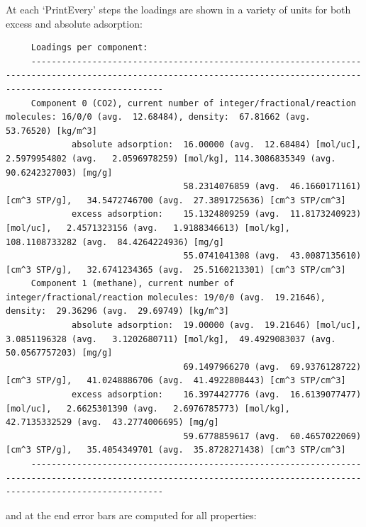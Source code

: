 At each `PrintEvery' steps the loadings are shown in a variety of units for both excess and absolute adsorption:
\begin{tiny}
\begin{verbatim}
     Loadings per component:
     ----------------------------------------------------------------------------------------------------------------------------------------------------------------------
     Component 0 (CO2), current number of integer/fractional/reaction molecules: 16/0/0 (avg.  12.68484), density:  67.81662 (avg.  53.76520) [kg/m^3]
             absolute adsorption:  16.00000 (avg.  12.68484) [mol/uc],   2.5979954802 (avg.   2.0596978259) [mol/kg], 114.3086835349 (avg.  90.6242327003) [mg/g]
                                   58.2314076859 (avg.  46.1660171161) [cm^3 STP/g],   34.5472746700 (avg.  27.3891725636) [cm^3 STP/cm^3]
             excess adsorption:    15.1324809259 (avg.  11.8173240923) [mol/uc],   2.4571323156 (avg.   1.9188346613) [mol/kg], 108.1108733282 (avg.  84.4264224936) [mg/g]
                                   55.0741041308 (avg.  43.0087135610) [cm^3 STP/g],   32.6741234365 (avg.  25.5160213301) [cm^3 STP/cm^3]
     Component 1 (methane), current number of integer/fractional/reaction molecules: 19/0/0 (avg.  19.21646), density:  29.36296 (avg.  29.69749) [kg/m^3]
             absolute adsorption:  19.00000 (avg.  19.21646) [mol/uc],   3.0851196328 (avg.   3.1202680711) [mol/kg],  49.4929083037 (avg.  50.0567757203) [mg/g]
                                   69.1497966270 (avg.  69.9376128722) [cm^3 STP/g],   41.0248886706 (avg.  41.4922808443) [cm^3 STP/cm^3]
             excess adsorption:    16.3974427776 (avg.  16.6139077477) [mol/uc],   2.6625301390 (avg.   2.6976785773) [mol/kg],  42.7135332529 (avg.  43.2774006695) [mg/g]
                                   59.6778859617 (avg.  60.4657022069) [cm^3 STP/g],   35.4054349701 (avg.  35.8728271438) [cm^3 STP/cm^3]
     ----------------------------------------------------------------------------------------------------------------------------------------------------------------------
\end{verbatim}
\end{tiny}
and at the end error bars are computed for all properties:
